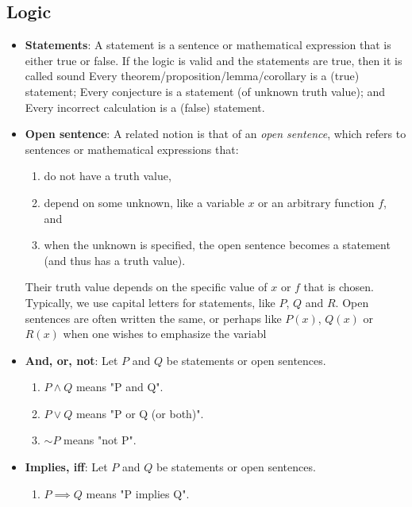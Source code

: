 \documentclass{report}
\begin{document}
    \subsection{Logic}
    \begin{itemize}
        \item \textbf{Statements}: A statement is a sentence or mathematical expression that is either true or false. If the logic is valid and the statements are true, then it is called sound
            \bigbreak \noindent 
            Every theorem/proposition/lemma/corollary is a (true) statement; Every conjecture is a statement (of unknown truth value); and Every incorrect calculation is a (false) statement.
        \item \textbf{Open sentence}: 
            A related notion is that of an \textit{open sentence}, which refers to sentences or mathematical expressions that:
            \begin{enumerate}
                \item do not have a truth value,
                \item depend on some unknown, like a variable $x$ or an arbitrary function $f$, and
                \item when the unknown is specified, the open sentence becomes a statement (and thus has a truth value).
            \end{enumerate}
            Their truth value depends on the specific value of $x$ or $f$ that is chosen.
            \bigbreak \noindent 
            Typically, we use capital letters for statements, like $P$, $Q$ and $R $. Open sentences are often written the same, or perhaps like $P(x)$, $Q(x)$ or $R(x)$ when one wishes to emphasize the variabl
        \item \textbf{And, or, not}: Let $P$ and $Q$ be statements or open sentences.
            \begin{enumerate}
                \item $P \land Q$ means "P and Q".
                \item $P \lor Q$ means "P or Q (or both)".
                \item $\sim P$ means "not P".
            \end{enumerate}
        \item \textbf{Implies, iff}:
            Let $P$ and $Q$ be statements or open sentences.
            \begin{enumerate}
                \item $P \implies Q$ means "P implies Q".

\end{enumerate}
\end{itemize}
\end{document}
